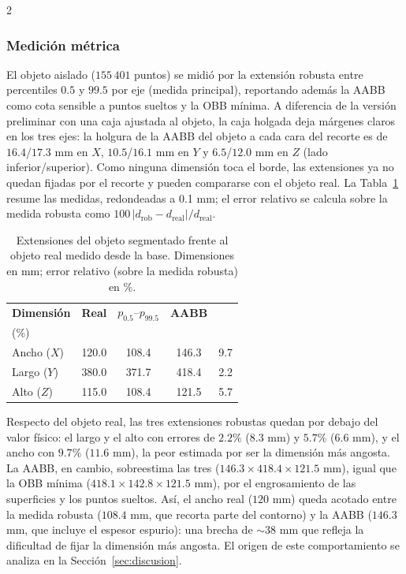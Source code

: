 \documentclass[10pt,a4paper]{article}
\begin{document}
\begin{multicols}{2}
\subsubsection{Medición métrica}
El objeto aislado ($155\,401$ puntos) se midió por la extensión robusta entre percentiles
$0.5$ y $99.5$ por eje (medida principal), reportando además la AABB como cota sensible a
puntos sueltos y la OBB mínima. A diferencia de la versión preliminar con una caja ajustada
al objeto, la caja holgada deja márgenes claros en los tres ejes: la holgura de la AABB del
objeto a cada cara del recorte es de $16.4$/$17.3$ mm en $X$, $10.5$/$16.1$ mm en $Y$ y
$6.5$/$12.0$ mm en $Z$ (lado inferior/superior). Como ninguna dimensión toca el borde, las
extensiones ya no quedan fijadas por el recorte y pueden compararse con el objeto real.
La Tabla~\ref{tab:mediciones} resume las medidas, redondeadas a 0.1 mm; el error relativo
se calcula sobre la medida robusta como $100\,|d_{\mathrm{rob}}-d_{\mathrm{real}}|/d_{\mathrm{real}}$.

\begin{table}[H]
    \centering
    \caption{Extensiones del objeto segmentado frente al objeto real medido desde la base.
    Dimensiones en mm; error relativo (sobre la medida robusta) en \%.}
    \label{tab:mediciones}
    \begin{tabular}{lcccc}
        \toprule
        \textbf{Dimensión} & \textbf{Real} & $p_{0.5}$--$p_{99.5}$ & \textbf{AABB} & \shortstack{\textbf{Error}\\(\%)} \\
        \midrule
        Ancho ($X$) & 120.0 & 108.4 & 146.3 & 9.7 \\
        Largo ($Y$) & 380.0 & 371.7 & 418.4 & 2.2 \\
        Alto ($Z$)  & 115.0 & 108.4 & 121.5 & 5.7 \\
        \bottomrule
    \end{tabular}
\end{table}

Respecto del objeto real, las tres extensiones robustas quedan por debajo del valor físico:
el largo y el alto con errores de $2.2\%$ ($8.3$ mm) y $5.7\%$ ($6.6$ mm), y el ancho con
$9.7\%$ ($11.6$ mm), la peor estimada por ser la dimensión más angosta. La AABB, en cambio,
sobreestima las tres ($146.3\times418.4\times121.5$ mm), igual que la OBB mínima
($418.1\times142.8\times121.5$ mm), por el engrosamiento de las superficies y los puntos
sueltos. Así, el ancho real ($120$ mm) queda acotado entre la medida robusta ($108.4$ mm, que
recorta parte del contorno) y la AABB ($146.3$ mm, que incluye el espesor espurio): una brecha
de $\sim38$ mm que refleja la dificultad de fijar la dimensión más angosta. El origen de este
comportamiento se analiza en la Sección~\ref{sec:discusion}.


\end{multicols}
\end{document}
